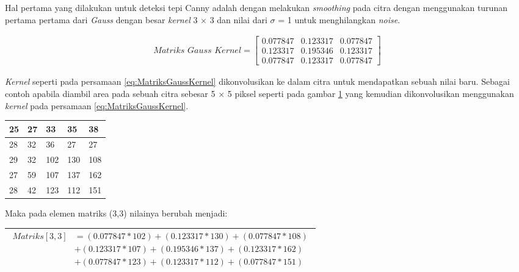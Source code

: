 \noindent Hal pertama yang dilakukan untuk deteksi tepi Canny adalah dengan melakukan \textit{smoothing} pada citra dengan menggunakan turunan pertama pertama dari \textit{Gauss} dengan besar \textit{kernel} 3 $\times$ 3 dan nilai dari $\sigma$ = 1 untuk menghilangkan \textit{noise}.

\begin{gather}
\textit{Matriks Gauss Kernel}
=
\begin{bmatrix}
0.077847 & 0.123317 & 0.077847 \\
0.123317 & 0.195346	& 0.123317 \\
0.077847 & 0.123317 & 0.077847
\end{bmatrix}
\label{eq:MatriksGaussKernel}
\end{gather} 

\noindent\textit{Kernel} seperti pada persamaan \ref{eq:MatriksGaussKernel} dikonvolusikan ke dalam citra untuk mendapatkan sebuah nilai baru. Sebagai contoh apabila diambil area pada sebuah citra sebesar 5 $\times$ 5 piksel seperti pada gambar \ref{fig:MatriksCitra} yang kemudian dikonvolusikan menggunakan \textit{kernel} pada persamaan \ref{eq:MatriksGaussKernel}.

\begin{table}[H]
	\centering
	\begin{small}
		\begin{tabular}{|p{1cm}|p{1cm}|p{1cm}|p{1cm}|p{1cm}|}
			\hline
			25 & 27 & 33 & 35 & 38 \\
			\hline
			28 & 32 & 36 & 27 & 27 \\
			\hline
			29 & 32 & 102 & 130 & 108 \\
			\hline
			27 & 59 & 107 & 137 & 162 \\
			\hline
			28 & 42 & 123 & 112 & 151 \\\hline
		\end{tabular}
	\end{small}
	\label{fig:MatriksCitra}
\end{table}

\noindent Maka pada elemen matriks (3,3) nilainya berubah menjadi:
\begin{table}[H]
	\begin{adjustbox}{width=1\textwidth}
		\begin{tabular}{|p{13.55cm}|}
			\hline
			\begin{equation}\nonumber
			\begin{aligned}
			Matriks[3,3] &= (0.077847 * 102) + (0.123317 * 130) + (0.077847 * 108) \\
						 &+ (0.123317 * 107) + (0.195346 * 137) + (0.123317 * 162) \\
						 &+ (0.077847 * 123) + (0.123317 * 112) + (0.077847 * 151)\\
			\end{aligned}
			\end{equation}\\
			\hline
		\end{tabular}
	\end{adjustbox}
\end{table}

